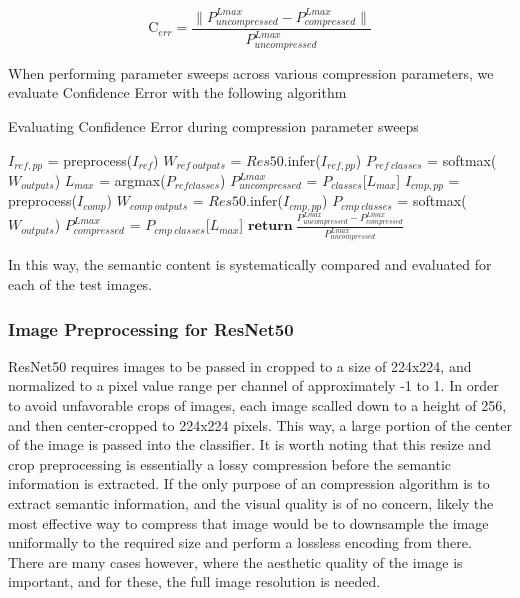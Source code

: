 $$
\textrm{C}_{err} = \frac{\|P^{Lmax}_{uncompressed} - P^{Lmax}_{compressed}\|}{P^{Lmax}_{uncompressed}}
$$

When performing parameter sweeps across various compression parameters, we evaluate Confidence Error with the following algorithm
\begin{algorithm}
    \label{alg:Confidence Error Algorithm}
    \caption{Evaluating Confidence Error during compression parameter sweeps}
	\begin{algorithmic}[1]
	\State $I_{ref, pp}$ = preprocess($I_{ref}$)
	\State $W_{ref \ outputs}$ = $Res50$.infer($I_{ref, pp}$)
	\State $P_{ref \ classes}$ = softmax($W_{outputs}$)
	\State $L_{max}$ = argmax({$P_{ref classes}$})
	\State $P^{Lmax}_{uncompressed}$ = $P_{classes}$[$L_{max}$]
	\State $I_{cmp, pp}$ = preprocess($I_{comp}$)
	\State $W_{comp \ outputs}$ = $Res50$.infer($I_{cmp, pp}$)
	\State $P_{cmp \ classes}$ = softmax($W_{outputs}$)
	\State $P^{Lmax}_{compressed}$ =  $P_{cmp \ classes}$[$L_{max}$]
	\State $\textbf{return}\ \frac{P^{Lmax}_{uncompressed} - P^{Lmax}_{compressed}}{P^{Lmax}_{uncompressed}}$
	\end{algorithmic}
\end{algorithm}

In this way, the semantic content is systematically compared and evaluated for each of the test images.

\subsubsection{Image Preprocessing for ResNet50}

ResNet50 requires images to be passed in cropped to a size of 224x224, and normalized to a pixel value range per channel of approximately -1 to 1. In order to avoid unfavorable crops of images, each image scalled down to a height of 256, and then center-cropped to 224x224 pixels. This way, a large portion of the center of the image is passed into the classifier. It is worth noting that this resize and crop preprocessing is essentially a lossy compression before the semantic information is extracted. If the only purpose of an compression algorithm is to extract semantic information, and the visual quality is of no concern, likely the most effective way to compress that image would be to downsample the image uniformally to the required size and perform a lossless encoding from there. There are many cases however, where the aesthetic quality of the image is important, and for these, the full image resolution is needed.

